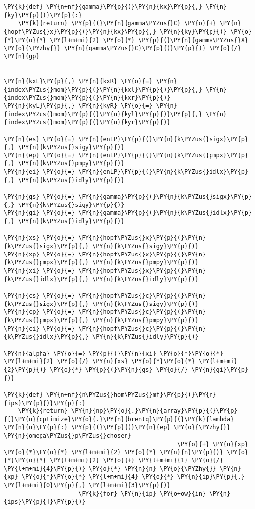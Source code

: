 \begin{Verbatim}[commandchars=\\\{\}]
\PY{k}{def} \PY{n+nf}{gamma}\PY{p}{(}\PY{n}{kx}\PY{p}{,} \PY{n}{ky}\PY{p}{)}\PY{p}{:}
    \PY{k}{return} \PY{p}{(}\PY{n}{gamma\PYZus{}C} \PY{o}{+} \PY{n}{hopf\PYZus{}x}\PY{p}{(}\PY{n}{kx}\PY{p}{,} \PY{n}{ky}\PY{p}{)} \PY{o}{*}\PY{o}{*} \PY{l+m+mi}{2} \PY{o}{*} \PY{p}{(}\PY{n}{gamma\PYZus{}X} \PY{o}{\PYZhy{}} \PY{n}{gamma\PYZus{}C}\PY{p}{)}\PY{p}{)} \PY{o}{/} \PY{n}{gp}


\PY{n}{kxL}\PY{p}{,} \PY{n}{kxR} \PY{o}{=} \PY{n}{index\PYZus{}mom}\PY{p}{(}\PY{n}{kxl}\PY{p}{)}\PY{p}{,} \PY{n}{index\PYZus{}mom}\PY{p}{(}\PY{n}{kxr}\PY{p}{)}
\PY{n}{kyL}\PY{p}{,} \PY{n}{kyR} \PY{o}{=} \PY{n}{index\PYZus{}mom}\PY{p}{(}\PY{n}{kyl}\PY{p}{)}\PY{p}{,} \PY{n}{index\PYZus{}mom}\PY{p}{(}\PY{n}{kyr}\PY{p}{)}

\PY{n}{es} \PY{o}{=} \PY{n}{enLP}\PY{p}{(}\PY{n}{k\PYZus{}sigx}\PY{p}{,} \PY{n}{k\PYZus{}sigy}\PY{p}{)}
\PY{n}{ep} \PY{o}{=} \PY{n}{enLP}\PY{p}{(}\PY{n}{k\PYZus{}pmpx}\PY{p}{,} \PY{n}{k\PYZus{}pmpy}\PY{p}{)}
\PY{n}{ei} \PY{o}{=} \PY{n}{enLP}\PY{p}{(}\PY{n}{k\PYZus{}idlx}\PY{p}{,} \PY{n}{k\PYZus{}idly}\PY{p}{)}

\PY{n}{gs} \PY{o}{=} \PY{n}{gamma}\PY{p}{(}\PY{n}{k\PYZus{}sigx}\PY{p}{,} \PY{n}{k\PYZus{}sigy}\PY{p}{)}
\PY{n}{gi} \PY{o}{=} \PY{n}{gamma}\PY{p}{(}\PY{n}{k\PYZus{}idlx}\PY{p}{,} \PY{n}{k\PYZus{}idly}\PY{p}{)}

\PY{n}{xs} \PY{o}{=} \PY{n}{hopf\PYZus{}x}\PY{p}{(}\PY{n}{k\PYZus{}sigx}\PY{p}{,} \PY{n}{k\PYZus{}sigy}\PY{p}{)}
\PY{n}{xp} \PY{o}{=} \PY{n}{hopf\PYZus{}x}\PY{p}{(}\PY{n}{k\PYZus{}pmpx}\PY{p}{,} \PY{n}{k\PYZus{}pmpy}\PY{p}{)}
\PY{n}{xi} \PY{o}{=} \PY{n}{hopf\PYZus{}x}\PY{p}{(}\PY{n}{k\PYZus{}idlx}\PY{p}{,} \PY{n}{k\PYZus{}idly}\PY{p}{)}

\PY{n}{cs} \PY{o}{=} \PY{n}{hopf\PYZus{}c}\PY{p}{(}\PY{n}{k\PYZus{}sigx}\PY{p}{,} \PY{n}{k\PYZus{}sigy}\PY{p}{)}
\PY{n}{cp} \PY{o}{=} \PY{n}{hopf\PYZus{}c}\PY{p}{(}\PY{n}{k\PYZus{}pmpx}\PY{p}{,} \PY{n}{k\PYZus{}pmpy}\PY{p}{)}
\PY{n}{ci} \PY{o}{=} \PY{n}{hopf\PYZus{}c}\PY{p}{(}\PY{n}{k\PYZus{}idlx}\PY{p}{,} \PY{n}{k\PYZus{}idly}\PY{p}{)}

\PY{n}{alpha} \PY{o}{=} \PY{p}{(}\PY{n}{xi} \PY{o}{*}\PY{o}{*} \PY{l+m+mi}{2} \PY{o}{/} \PY{n}{xs} \PY{o}{*}\PY{o}{*} \PY{l+m+mi}{2}\PY{p}{)} \PY{o}{*} \PY{p}{(}\PY{n}{gs} \PY{o}{/} \PY{n}{gi}\PY{p}{)}

\PY{k}{def} \PY{n+nf}{n\PYZus{}hom\PYZus{}mf}\PY{p}{(}\PY{n}{ips}\PY{p}{)}\PY{p}{:}
    \PY{k}{return} \PY{n}{np}\PY{o}{.}\PY{n}{array}\PY{p}{(}\PY{p}{[}\PY{n}{optimize}\PY{o}{.}\PY{n}{brentq}\PY{p}{(}\PY{k}{lambda} \PY{n}{n}\PY{p}{:} \PY{p}{(}\PY{p}{(}\PY{n}{ep} \PY{o}{\PYZhy{}} \PY{n}{omega\PYZus{}p\PYZus{}chosen}
                                                 \PY{o}{+} \PY{n}{xp} \PY{o}{*}\PY{o}{*} \PY{l+m+mi}{2} \PY{o}{*} \PY{n}{n}\PY{p}{)} \PY{o}{*}\PY{o}{*} \PY{l+m+mi}{2} \PY{o}{+} \PY{l+m+mi}{1} \PY{o}{/} \PY{l+m+mi}{4}\PY{p}{)} \PY{o}{*} \PY{n}{n} \PY{o}{\PYZhy{}} \PY{n}{xp} \PY{o}{*}\PY{o}{*} \PY{l+m+mi}{4} \PY{o}{*} \PY{n}{ip}\PY{p}{,} \PY{l+m+mi}{0}\PY{p}{,} \PY{l+m+mi}{3}\PY{p}{)}
                     \PY{k}{for} \PY{n}{ip} \PY{o+ow}{in} \PY{n}{ips}\PY{p}{]}\PY{p}{)}



\end{Verbatim}
